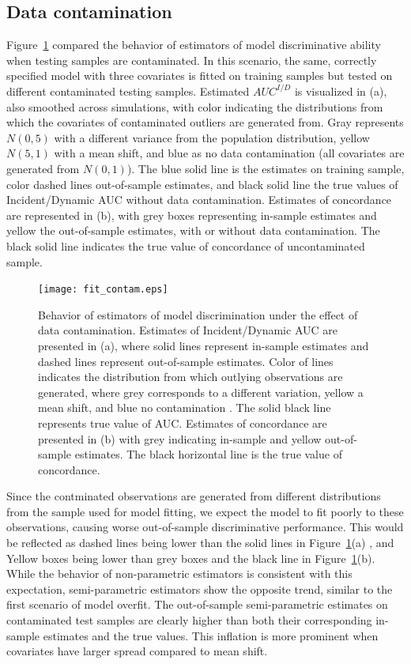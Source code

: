\documentclass[useAMS,usenatbib, referee]{biom}
\begin{document}
\subsection{Data contamination}
\label{sec:sim_contam}

Figure~\ref{fig:contam} compared the behavior of estimators of model discriminative ability when testing samples are contaminated. In this scenario, the same, correctly specified model with three covariates is fitted on training samples but tested on different contaminated testing samples. Estimated $AUC^{I/D}$ is visualized in (a), also smoothed across simulations, with color indicating the distributions from which the covariates of contaminated outliers are generated from. Gray represents $N(0, 5)$ with a different variance from the population distribution, yellow $N(5, 1)$ with a mean shift, and blue as no data contamination (all covariates are generated from $N(0, 1)$). The blue solid line is the estimates on training sample, color dashed lines out-of-sample estimates, and black solid line the true values of Incident/Dynamic AUC without data contamination. Estimates of concordance are represented in (b), with grey boxes representing in-sample estimates and yellow the out-of-sample estimates, with or without data contamination. The black solid line indicates the true value of concordance of uncontaminated sample. 


\begin{figure}
    \centerline{\texttt{[image: fit\_contam.eps]}}
    \caption{Behavior of estimators of model discrimination under the effect of data contamination. Estimates of Incident/Dynamic AUC are presented in (a), where solid lines represent in-sample estimates and dashed lines represent out-of-sample estimates. Color of lines indicates the distribution from which outlying observations are generated, where grey corresponds to a different variation, yellow a mean shift, and blue no contamination . The solid black line represents true value of AUC. Estimates of concordance are presented in (b) with grey indicating in-sample and yellow out-of-sample estimates. The black horizontal line is the true value of concordance.}
    \label{fig:contam}
\end{figure}

Since the contminated observations are generated from different distributions from the sample used for model fitting, we expect the model to fit poorly to these observations, causing worse out-of-sample discriminative performance. This would be reflected as dashed lines being lower than the solid lines in Figure~\ref{fig:contam}(a) , and Yellow boxes being lower than grey boxes and the black line in Figure~\ref{fig:contam}(b). While the behavior of non-parametric estimators is consistent with this expectation, semi-parametric estimators show the opposite trend, similar to the first scenario of model overfit. The out-of-sample semi-parametric estimates on contaminated test samples are clearly higher than both their corresponding in-sample estimates and the true values. This inflation is more prominent when covariates have larger spread compared to mean shift. 
\end{document}
